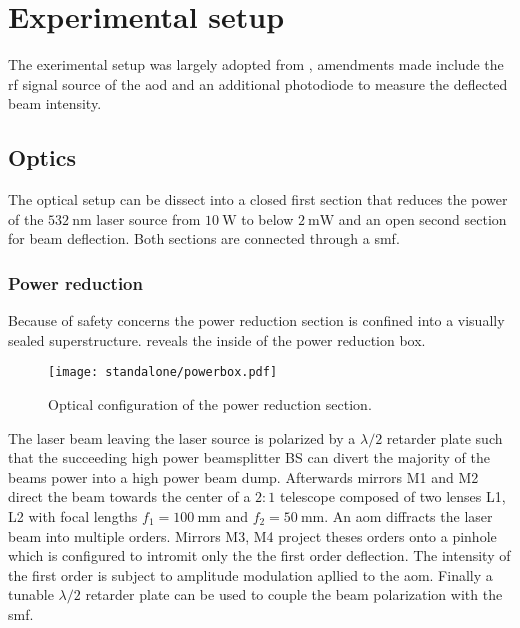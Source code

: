 \chapter{Experimental setup}

The exerimental setup was largely adopted from \cite{Hertlein2017}, amendments
made include the \gls{rf} signal source of the \gls{aod} and an additional
photodiode to measure the deflected beam intensity.

\section{Optics}

The optical setup can be dissect into a closed first section that reduces
the power of the $\SI{532}{\nano\meter}$ laser source from $\SI{10}{\watt}$
to below $\SI{2}{\milli\watt}$ and an open second section for beam deflection.
Both sections are connected through a \gls{smf}.

\subsection{Power reduction}
\label{sec:powerbox}

Because of safety concerns the power reduction section is confined into a
visually sealed superstructure.  reveals the inside of the
power reduction box.

\begin{figure}[h]
  \centering
  \texttt{[image: standalone/powerbox.pdf]}
  \caption{Optical configuration of the power reduction section.}
  \label{fig:powerbox}
\end{figure}

The laser beam leaving the laser source is polarized by a $\lambda/2$ retarder
plate such that the succeeding high power beamsplitter BS can divert the
majority of the beams power into a high power beam dump.
Afterwards mirrors M1 and M2 direct the beam towards the center of a $2:1$
telescope composed of two lenses L1, L2 with focal lengths
$f_1=\SI{100}{\milli\meter}$ and $f_2=\SI{50}{\milli\meter}$.
An \gls{aom} diffracts the laser beam into multiple orders. Mirrors M3, M4
project theses orders onto a pinhole which is configured to intromit only the
the first order deflection. The intensity of the first order is subject to
amplitude modulation apllied to the \gls{aom}.
Finally a tunable $\lambda/2$ retarder plate can be used to couple the beam
polarization with the \gls{smf}.

